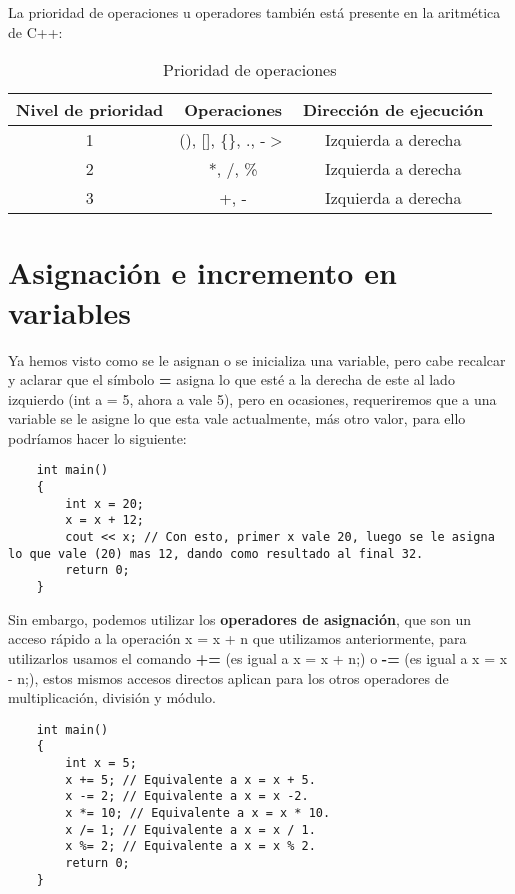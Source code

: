 La prioridad de operaciones u operadores también está presente en la aritmética de C++:
\begin{table}[H]
    \begin{center}
        \caption{Prioridad de operaciones}
        \label{tab: 2}
        \begin{tabular}{c c c}
            \hline
            \textbf{Nivel de prioridad}&\textbf{Operaciones}&\textbf{Dirección de ejecución} \\
            \hline
            1   & (), [], \{\}, ., -$>$ & Izquierda a derecha \\
            2   & *, /, \%              & Izquierda a derecha \\
            3   & +, -                  & Izquierda a derecha \\
            \hline
        \end{tabular}
    \end{center}
\end{table}



\section{Asignación e incremento en variables}

Ya hemos visto como se le asignan o se inicializa una variable, pero cabe recalcar y aclarar que el símbolo \textbf{=} asigna lo que esté a la derecha de este al lado izquierdo (int a = 5, ahora a vale 5), pero en ocasiones, requeriremos que a una variable se le asigne lo que esta vale actualmente, más otro valor, para ello podríamos hacer lo siguiente:
\begin{lstlisting}
    int main()
    {
        int x = 20;
        x = x + 12;
        cout << x; // Con esto, primer x vale 20, luego se le asigna lo que vale (20) mas 12, dando como resultado al final 32.
        return 0;
    }
\end{lstlisting}

Sin embargo, podemos utilizar los \textbf{operadores de asignación}, que son un acceso rápido a la operación x = x + n que utilizamos anteriormente, para utilizarlos usamos el comando \textbf{+=} (es igual a x = x + n;) o \textbf{-=} (es igual a x = x - n;), estos mismos accesos directos aplican para los otros operadores de multiplicación, división y módulo.
\begin{lstlisting}
    int main()
    {
        int x = 5;
        x += 5; // Equivalente a x = x + 5.
        x -= 2; // Equivalente a x = x -2.
        x *= 10; // Equivalente a x = x * 10.
        x /= 1; // Equivalente a x = x / 1.
        x %= 2; // Equivalente a x = x % 2.
        return 0;
    }
\end{lstlisting}

